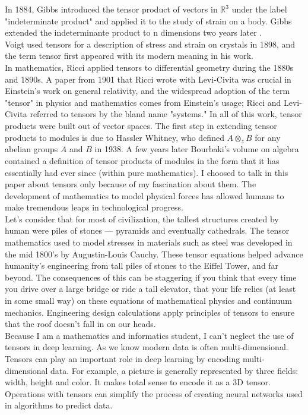 \documentclass[12pt,a4paper]{article}
\begin{document}
 In 1884, Gibbs introduced the tensor product of vectors in $\mathbb{R}^3$ under the label "indeterminate product" and applied it to the study of strain on a body. Gibbs extended the indeterminante product to n dimensions two years later . \\Voigt used tensors for a description of stress and strain on crystals in 1898, and the term tensor first appeared with its modern meaning in his work.\\ In mathematics, Ricci applied tensors to differential geometry during the 1880s and 1890s. A paper from 1901 that Ricci wrote with Levi-Civita  was crucial in Einstein's work on general relativity, and the widespread adoption of the term "tensor" in physics and mathematics comes from Einstein's usage; Ricci and Levi-Civita referred to tensors by the bland name "systems." In all of this work, tensor products were built out of vector spaces. The first step in extending tensor products to modules is due to Hassler Whitney, who defined $A \otimes_z B$ for any abelian groups $A$ and $B$ in 1938. A few years later Bourbaki's volume on algebra contained a definition of tensor products of modules in the form that it has essentially had ever since (within pure mathematics).
I choosed to talk in this paper about tensors only because of my fascination about them. The development of mathematics to model physical forces has allowed humans to make tremendous leaps in technological progress.\\
Let’s consider that for most of civilization, the tallest structures created by human were piles of stones — pyramids and eventually cathedrals.
The tensor mathematics used to model stresses in materials such as steel was developed in the mid 1800’s by Augustin-Louis Cauchy. These tensor equations helped advance humanity’s engineering from tall piles of stones to the Eiffel Tower, and far beyond.
The consequences of this can be staggering if you think that every time you drive over a large bridge or ride a tall elevator, that your life relies (at least in some small way) on these equations of mathematical physics and continuum mechanics. Engineering design calculations apply principles of tensors to ensure that the roof doesn’t fall in on our heads.\\
Because I am a mathematics and informatics student, I can't neglect the use of tensors in deep learning. As we know modern data is often multi-dimensional. Tensors can play an important role in deep learning by encoding multi-dimensional data. For example, a picture is generally represented by three fields: width, height and color. It makes total sense to encode it as a 3D tensor.  Operations with tensors can simplify the process of creating neural networks used in algorithms to predict data.\\
\end{document}
